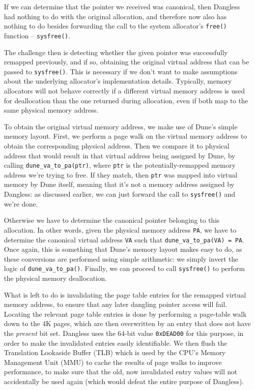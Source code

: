 If we can determine that the pointer we received was canonical, then Dangless had nothing to do with the original allocation, and therefore now also has nothing to do besides forwarding the call to the system allocator's \lstinline!free()! function -- \lstinline!sysfree()!.

The challenge then is detecting whether the given pointer was successfully remapped previously, and if so, obtaining the original virtual address that can be passed to \lstinline!sysfree()!.
This is necessary if we don't want to make assumptions about the underlying allocator's implementation details. Typically, memory allocators will not behave correctly if a different virtual memory address is used for deallocation than the one returned during allocation, even if both map to the same physical memory address.

To obtain the original virtual memory address, we make use of Dune's simple memory layout. First, we perform a page walk on the virtual memory address to obtain the corresponding physical address. Then we compare it to physical address that would result in that virtual address being assigned by Dune, by calling \lstinline!dune_va_to_pa(ptr)!, where \lstinline!ptr! is the potentially-remapped memory address we're trying to free.
If they match, then \lstinline!ptr! was mapped into virtual memory by Dune itself, meaning that it's not a memory address assigned by Dangless: as discussed earlier, we can just forward the call to \lstinline!sysfree()! and we're done.

Otherwise we have to determine the canonical pointer belonging to this allocation. In other words, given the physical memory address \lstinline!PA!, we have to determine the canonical virtual address \lstinline!VA! such that \lstinline!dune_va_to_pa(VA) = PA!. Once again, this is something that Dune's memory layout makes easy to do, as these conversions are performed using simple arithmetic: we simply invert the logic of \lstinline!dune_va_to_pa()!. Finally, we can proceed to call \lstinline!sysfree()! to perform the physical memory deallocation.

What is left to do is invalidating the page table entries for the remapped virtual memory address, to ensure that any later dangling pointer access will fail. Locating the relevant page table entries is done by performing a page-table walk down to the 4K pages, which are then overwritten by an entry that does not have the \emph{present} bit set. Dangless uses the 64-bit value \lstinline!0xDEAD00! for this purpose, in order to make the invalidated entries easily identifiable. We then flush the Translation Lookaside Buffer (TLB) which is used by the CPU's Memory Management Unit (MMU) to cache the results of page walks to improve performance, to make sure that the old, now invalidated entry values will not accidentally be used again (which would defeat the entire purpose of Dangless).

